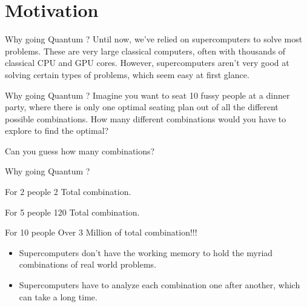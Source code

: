 \graphicspath{{assets/motivation/}}

\section[Motivation]{Motivation}

\begin{frame}{Why going Quantum ?}
	Until now, we’ve relied on supercomputers to solve most problems. These are very large classical computers, often with thousands of classical CPU and GPU cores. However, supercomputers aren’t very good at solving certain types of problems, which seem easy at first glance. 
\end{frame}

\begin{frame}{Why going Quantum ?}
Imagine you want to seat 10 fussy people at a dinner party, where there is only one optimal seating plan out of all the different possible combinations. How many different combinations would you have to explore to find the optimal?

Can you guess how many \alert{combinations}?
\end{frame}

\begin{frame}[<+- | only+>]{Why going Quantum ?}
	
	
	\begin{exampleblock}{For 2 people}
		2 Total combination.
	\end{exampleblock}
	

	\begin{block}{For 5 people}
		120 Total combination.
	\end{block}
	

	\begin{alertblock}{For 10 people}
		Over 3 Million of total combination!!!
	\end{alertblock}	
	
	\begin{itemize}
		\item Supercomputers don't have the working \alert{memory} to hold the myriad combinations of real world problems.
		\item Supercomputers have to analyze each combination one after another, which can take a long \alert{time}.
	\end{itemize}
\end{frame}


